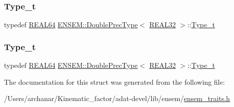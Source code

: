 \mbox{\label{structENSEM_1_1DoublePrecType_3_01REAL32_01_4_ae855602a46f5a89750f4c0c7d39277e8}} 
\subsubsection{\texorpdfstring{Type\_t}{Type\_t}\hspace{0.1cm}{\footnotesize\ttfamily [2/3]}}
{\footnotesize\ttfamily typedef \mbox{\hyperlink{namespaceENSEM_a85b215b9f1f43715aebee01718e25082}{R\+E\+A\+L64}} \mbox{\hyperlink{structENSEM_1_1DoublePrecType}{E\+N\+S\+E\+M\+::\+Double\+Prec\+Type}}$<$ \mbox{\hyperlink{namespaceENSEM_a7540d01191172323e9073283d772576d}{R\+E\+A\+L32}} $>$\+::\mbox{\hyperlink{structENSEM_1_1DoublePrecType_3_01REAL32_01_4_ae855602a46f5a89750f4c0c7d39277e8}{Type\+\_\+t}}}

\mbox{\label{structENSEM_1_1DoublePrecType_3_01REAL32_01_4_ae855602a46f5a89750f4c0c7d39277e8}} 
\subsubsection{\texorpdfstring{Type\_t}{Type\_t}\hspace{0.1cm}{\footnotesize\ttfamily [3/3]}}
{\footnotesize\ttfamily typedef \mbox{\hyperlink{namespaceENSEM_a85b215b9f1f43715aebee01718e25082}{R\+E\+A\+L64}} \mbox{\hyperlink{structENSEM_1_1DoublePrecType}{E\+N\+S\+E\+M\+::\+Double\+Prec\+Type}}$<$ \mbox{\hyperlink{namespaceENSEM_a7540d01191172323e9073283d772576d}{R\+E\+A\+L32}} $>$\+::\mbox{\hyperlink{structENSEM_1_1DoublePrecType_3_01REAL32_01_4_ae855602a46f5a89750f4c0c7d39277e8}{Type\+\_\+t}}}



The documentation for this struct was generated from the following file\+:\begin{DoxyCompactItemize}
\item 
/\+Users/archanar/\+Kinematic\+\_\+factor/adat-\/devel/lib/ensem/\mbox{\hyperlink{adat-devel_2lib_2ensem_2ensem__traits_8h}{ensem\+\_\+traits.\+h}}\end{DoxyCompactItemize}
